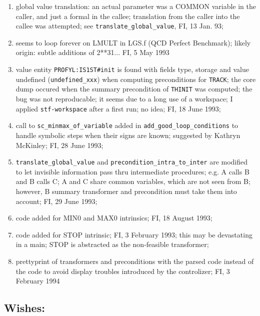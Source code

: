 \begin{enumerate}
  \item global value translation: an actual parameter was a COMMON
	variable in the caller, and just a formal in the callee;
	translation from the caller into the callee was attempted;
	see \verb+translate_global_value+, FI, 13 Jan. 93;

  \item seems to loop forever on LMULT in LGS.f (QCD Perfect Benchmark);
	likely origin: subtle additions of 2**31... FI, 5 May 1993

  \item value entity \verb+PROFYL:IS1ST#init+ is found with fields type,
	storage and value undefined (\verb+undefined_xxx+) when
	computing preconditions for \verb+TRACK+; the core dump occured
	when the summary precondition of \verb+THINIT+ was computed;
	the bug was not reproducable; it seems due to a long use of
	a workspace; I applied \verb+stf-workspace+ after a first run;
	no idea; FI, 18 June 1993;

  \item call to \verb+sc_minmax_of_variable+ added in
	\verb+add_good_loop_conditions+ to handle symbolic steps
	when their signs are known; suggested by Kathryn McKinley;
	FI, 28 June 1993;

  \item \verb+translate_global_value+ and
	\verb+precondition_intra_to_inter+ are modified to let invisible
	information pass thru intermediate procedures; e.g. A calls B
	and B calls C; A and C share common variables, which are not
	seen from B; however, B summary transformer and precondition
	must take them into account; FI, 29 June 1993;

  \item code added for MIN0 and MAX0 intrinsics; FI, 18 August 1993;

  \item code added for STOP intrinsic; FI, 3 February 1993; this may be
	devastating in a main; STOP is abstracted as the non-feasible
	transformer;

  \item prettyprint of transformers and preconditions with the parsed
	code instead of the code to avoid display troubles introduced by
	the controlizer; FI, 3 February 1994

\end{enumerate}

\subsection{Wishes:}

